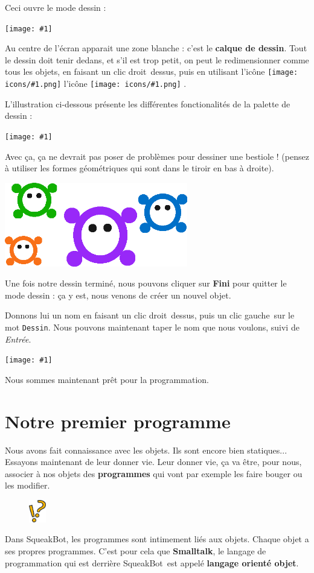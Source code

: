 \documentclass[a4paper,12pt]{book}
\def\appName{SqueakBot}
\def\cd{clic droit~}
\def\cg{clic gauche~}
\newcommand{\capture}[1]
{
\begin{center}
	\texttt{[image: \#1]}
\end{center}
}
\newcommand{\important}[1]{\textbf{#1}}
\newcommand{\inserticon}[1]
{
\texttt{[image: icons/\#1.png]}
}
\newcommand{\icon}[2][]
{
\ifthenelse {\equal{#1} {}} {\inserticon{#2}} {l'icône \inserticon{#2} \important{#1}}
}
\newcommand{\afaire}[1]
{
#1
}
\newcommand{\astuce}[1]
{
\begin{framed}
\begin{figure}
	\vspace{-15pt}
	\includegraphics[width=2.0em]{astuce.png}
\end{figure}
#1
\end{framed}
}
\let\myMargin\marginpar
\renewcommand{\marginpar}[1]{\myMargin{{\scriptsize \sffamily #1}}}
\begin{document}
Ceci ouvre le mode dessin :

\capture{5.png}

Au centre de l'écran apparait une zone blanche : c'est le \important{calque de
dessin}. Tout le dessin doit tenir dedans, et s'il est trop petit, on peut le
redimensionner comme tous les objets, en faisant un \cd dessus, puis en
utilisant l'icône \icon{redimensionner}.

L'illustration ci-dessous présente les différentes fonctionalités de la palette
de dessin :

\capture{6.png}

\afaire{ Avec ça, ça ne devrait pas poser de problèmes pour dessiner une
bestiole ! (pensez à utiliser les formes géométriques qui sont dans le tiroir
en bas à droite).  }

\begin{center} \includegraphics[width=8cm]{bestioles.png} \end{center}

\afaire{ Une fois notre dessin terminé, nous pouvons cliquer sur \textbf{Fini}
pour quitter le mode dessin : ça y est, nous venons de créer un nouvel objet.

Donnons lui un nom en faisant un \cd dessus, puis un \cg sur le mot
\texttt{Dessin}. Nous pouvons maintenant taper le nom que nous voulons, suivi
de \textit{Entrée}.  }

\capture{7.png}

Nous sommes maintenant prêt pour la programmation.

\section{Notre premier programme} \label{premier_programme}

Nous avons fait connaissance avec les objets. Ils sont encore bien statiques...
Essayons maintenant de leur donner vie. Leur donner vie, ça va être, pour nous,
associer à nos objets des \important{programmes} qui vont par exemple les faire
bouger ou les modifier.\astuce{Dans \appName, les programmes sont intimement
liés aux objets. Chaque objet a ses propres programmes. C'est pour cela que
\important{Smalltalk}, le langage de programmation qui est derrière
\appName~est appelé \important{langage orienté objet}.}
\end{document}
